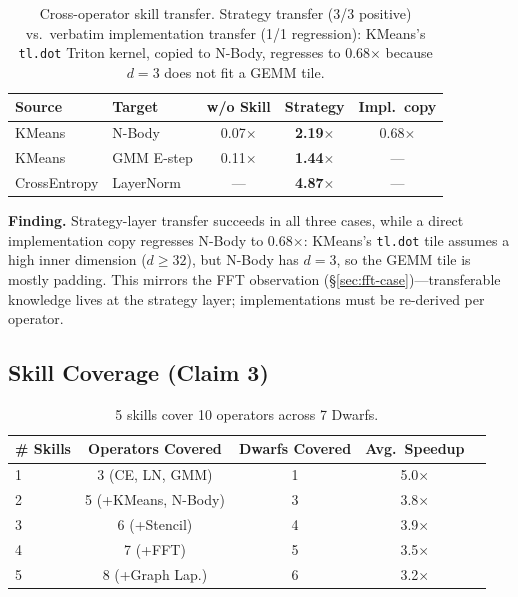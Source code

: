 \documentclass[sigconf,nonacm]{acmart}
\begin{document}
\begin{table}[h]
\centering
\caption{Cross-operator skill transfer. Strategy transfer (3/3
positive) vs.\ verbatim implementation transfer (1/1 regression):
KMeans's \texttt{tl.dot} Triton kernel, copied to N-Body, regresses
to 0.68$\times$ because $d{=}3$ does not fit a GEMM tile.}
\label{tab:transfer}
\small
\begin{tabular}{llccc}
\toprule
Source & Target & w/o Skill & Strategy & Impl.\ copy \\
\midrule
KMeans       & N-Body     & 0.07$\times$ & \textbf{2.19$\times$} & 0.68$\times$ \\
KMeans       & GMM E-step & 0.11$\times$ & \textbf{1.44$\times$} & --- \\
CrossEntropy & LayerNorm  & ---          & \textbf{4.87$\times$} & --- \\
\bottomrule
\end{tabular}
\end{table}

\textbf{Finding.} Strategy-layer transfer succeeds in all three
cases, while a direct implementation copy regresses N-Body to
0.68$\times$: KMeans's \texttt{tl.dot} tile assumes a high inner
dimension ($d{\geq}32$), but N-Body has $d{=}3$, so the GEMM tile
is mostly padding. This mirrors the FFT observation
(\S\ref{sec:fft-case})---transferable knowledge lives at the
strategy layer; implementations must be re-derived per operator.

\subsection{Skill Coverage (Claim 3)}

\begin{table}[h]
\centering
\caption{5 skills cover 10 operators across 7 Dwarfs.}
\label{tab:coverage}
\setlength{\tabcolsep}{4pt}
\small
\begin{tabular}{lcccc}
\toprule
\# Skills & Operators Covered & Dwarfs Covered & Avg.\ Speedup \\
\midrule
1 & 3 (CE, LN, GMM) & 1 & 5.0$\times$ \\
2 & 5 (+KMeans, N-Body) & 3 & 3.8$\times$ \\
3 & 6 (+Stencil) & 4 & 3.9$\times$ \\
4 & 7 (+FFT) & 5 & 3.5$\times$ \\
5 & 8 (+Graph Lap.) & 6 & 3.2$\times$ \\
\bottomrule
\end{tabular}
\end{table}
\end{document}
